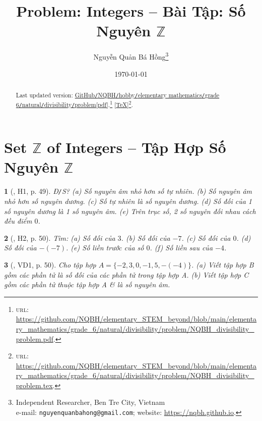 \documentclass{article}
\title{Problem: Integers -- Bài Tập: Số Nguyên $\mathbb{Z}$}
\author{Nguyễn Quản Bá Hồng\footnote{Independent Researcher, Ben Tre City, Vietnam\\e-mail: \texttt{nguyenquanbahong@gmail.com}; website: \url{https://nqbh.github.io}.}}
\date{\today}
\newtheorem{baitoan}{}
\begin{document}
\maketitle
\begin{abstract}
	Last updated version: \href{https://github.com/NQBH/elementary_STEM_beyond/blob/main/elementary_mathematics/grade_6/natural/divisibility/problem/NQBH_divisibility_problem.pdf}{GitHub{\tt/}NQBH{\tt/}hobby{\tt/}elementary mathematics{\tt/}grade 6{\tt/}natural{\tt/}divisibility{\tt/}problem[pdf]}.\footnote{\textsc{url}: \url{https://github.com/NQBH/elementary_STEM_beyond/blob/main/elementary_mathematics/grade_6/natural/divisibility/problem/NQBH_divisibility_problem.pdf}.} [\href{https://github.com/NQBH/elementary_STEM_beyond/blob/main/elementary_mathematics/grade_6/natural/divisibility/problem/NQBH_divisibility_problem.tex}{\TeX}]\footnote{\textsc{url}: \url{https://github.com/NQBH/elementary_STEM_beyond/blob/main/elementary_mathematics/grade_6/natural/divisibility/problem/NQBH_divisibility_problem.tex}.}. 
\end{abstract}
\tableofcontents


\section{Set $\mathbb{Z}$ of Integers -- Tập Hợp Số Nguyên $\mathbb{Z}$}

\begin{baitoan}[\cite{Binh_boi_duong_Toan_6_tap_1}, H1, p. 49]
	{\rm Đ{\tt/}S?} (a) Số nguyên âm nhỏ hơn số tự nhiên. (b) Số nguyên âm nhỏ hơn số nguyên dương. (c) Số tự nhiên là số nguyên dương. (d) Số đối của 1 số nguyên dương là 1 số nguyên âm. (e) Trên trục số, 2 số nguyên đối nhau cách đều điểm $0$.
\end{baitoan}

\begin{baitoan}[\cite{Binh_boi_duong_Toan_6_tap_1}, H2, p. 50]
	Tìm: (a) Số đối của $3$. (b) Số đối của $-7$. (c) Số đối của $0$. (d) Số đối của $-(-7)$. (e) Số liền trước của số $0$. (f) Số liền sau của $-4$.
\end{baitoan}

\begin{baitoan}[\cite{Binh_boi_duong_Toan_6_tap_1}, VD1, p. 50]
	Cho tập hợp $A = \{-2,3,0,-1,5,-(-4)\}$. (a) Viết tập hợp B gồm các phần tử là số đối của các phần tử trong tập hợp A. (b) Viết tập hợp C gồm các phần tử thuộc tập hợp A \& là số nguyên âm.
\end{baitoan}
\end{document}

